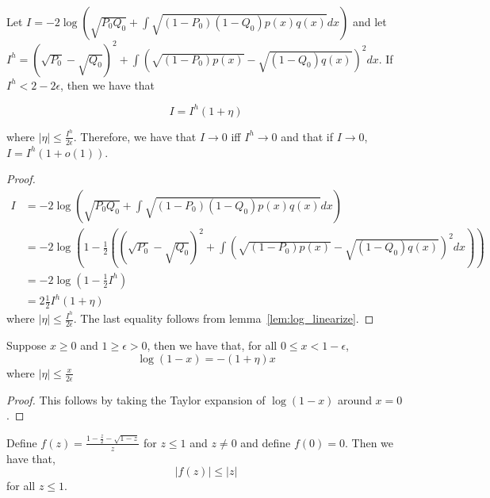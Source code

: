 \documentclass{article}
\begin{document}
\begin{lemma}
\label{lem:renyi_hellinger}
Let $I = -2 \log \left( \sqrt{P_0 Q_0} + \int \sqrt{(1-P_0)(1-Q_0) p(x) q(x)} dx \right)$ and let $I^{h} = (\sqrt{P_0} - \sqrt{Q_0})^2 + \int \left( \sqrt{ (1-P_0) p(x)} - \sqrt{ (1-Q_0) q(x)} \right)^2 dx$. If $I^h < 2 - 2\epsilon$, then we have that

\[
I = I^h(1+\eta)
\]

where $|\eta| \leq \frac{I^h}{2\epsilon}$. Therefore, we have that $I \rightarrow 0$ iff $I^h \rightarrow 0$ and that if $I \rightarrow 0$, $ I = I^h(1+o(1))$.

\end{lemma}

\begin{proof}

\begin{align*}
I &= -2 \log \left( \sqrt{P_0 Q_0} + \int \sqrt{(1-P_0)(1-Q_0) p(x) q(x)} dx \right) \\
  &= -2 \log \left( 1 - \frac{1}{2} \left( 
                (\sqrt{P_0} - \sqrt{Q_0})^2 + 
               \int (\sqrt{(1-P_0)p(x)} - \sqrt{(1-Q_0)q(x)} )^2 dx \right) \right)\\
 &= -2 \log \left(1 - \frac{1}{2} I^h \right) \\
  &= 2 \frac{1}{2} I^h (1 + \eta)
\end{align*}
where $|\eta| \leq \frac{I^h}{2 \epsilon}$. The last equality follows from lemma~\ref{lem:log_linearize}.

\end{proof}

\begin{lemma}
\label{lem:log_linearize}
Suppose $x \geq 0$ and $1 \geq \epsilon > 0$, then we have that, for all $0 \leq x < 1-\epsilon$,
\[
\log (1 - x) = - (1 + \eta) x 
\]
where $| \eta| \leq \frac{x}{2 \epsilon}$
\end{lemma}

\begin{proof}
This follows by taking the Taylor expansion of $\log (1 - x)$ around $x = 0$.
\end{proof}

\begin{lemma}
\label{lem:sqrt_linearize}
Define $f(z) =  \frac{1 - \frac{z}{2} - \sqrt{ 1 - z}}{z} $ for $z \leq 1$ and $z \neq 0$ and define $f(0) = 0$. Then we have that,
\[
\left| f(z)  \right| \leq |z|
\]
for all $z \leq 1$.
\end{lemma}
\end{document}
